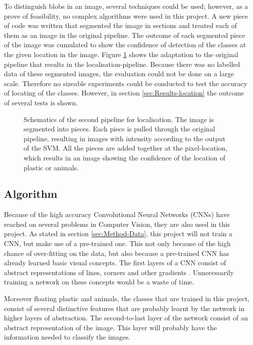To distinguish blobs in an image, several techniques could be used; however, as a prove of feasibility, no complex algorithms were used in this project.
A new piece of code was written that segmented the image in sections and treated each of them as an image in the original pipeline.
The outcome of each segmented piece of the image was cumulated to show the confidence of detection of the classes at the given location in the image.
Figure \ref{fig:locpip} shows the adaptation to the original pipeline that results in the localisation-pipeline.
Because there was no labelled data of these segmented images, the evaluation could not be done on a large scale.
Therefore no sizeable experiments could be conducted to test the accuracy of locating of the classes.
However, in section \ref{sec:Results-location} the outcome of several tests is shown.

\begin{figure}%
\centering
\ifx\showfig\undefined

\fi
\caption{Schematics of the second pipeline for localisation. The image is segmented into pieces. Each piece is pulled through the original pipeline, resulting in images with intensity according to the output of the SVM. All the pieces are added together at the pixel-location, which results in an image showing the confidence of the location of plastic or animals.}
\label{fig:locpip}
\end{figure}









\iffalse
\subsection{Algorithm}
\label{sec:Method-algotihm}
Because of the high accuracy Convolutional Neural Networks (CNNs) have reached on several problems in Computer Vision, they are also used in this project.
As stated in section \ref{sec:Method-Data}, this project will not train a CNN, but make use of a pre-trained one.
This not only because of the high chance of over-fitting on the data, but also because a pre-trained CNN has already learned basic visual concepts.
The first layers of a CNN consist of abstract representations of lines, corners and other gradients \citep{zeiler2014visualizing}.
Unnecessarily training a network on these concepts would be a waste of time.

Moreover floating plastic and animals, the classes that are trained in this project, consist of several distinctive features that are probably learnt by the network in higher layers of abstraction.
The second-to-last layer of the network consist of an abstract representation of the image.
This layer will probably have the information needed to classify the images. \citeneed


